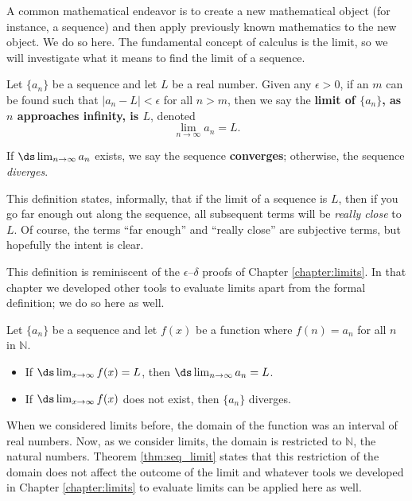 A common mathematical endeavor is to create a new mathematical object (for instance, a sequence) and then apply previously known mathematics to the new object. We do so here. The fundamental concept of calculus is the limit, so we will investigate what it means to find the limit of a sequence.

\setboxwidth{80pt}
{Let $\{a_n\}$ be a sequence and let $L$ be a real number. Given any $\epsilon>0$, if an $m$ can be found such that $|a_n-L|<\epsilon$ for all $n>m$, then we say the \textbf{limit of $\{a_n\}$, as $n$ approaches infinity, is $L$}, denoted $$\lim_{n\to\infty}a_n = L.$$

If $\ds\lim_{n\to\infty} a_n$ exists, we say the sequence \textbf{converges}; otherwise, the sequence \emph{diverges}.
}
\restoreboxwidth


This definition states, informally, that if the limit of a sequence is $L$, then if you go far enough out along the sequence, all subsequent terms will be \emph{really close} to $L$. Of course, the terms ``far enough'' and ``really close'' are subjective terms, but hopefully the intent is clear.

This definition is reminiscent of the $\epsilon$--$\delta$ proofs of Chapter \ref{chapter:limits}. In that chapter we developed other tools to evaluate limits apart from the formal definition; we do so here as well.
\clearpage

\setboxwidth{30pt}
\noindent\hskip-30pt
\begin{minipage}{\specialboxlength}
{Let $\{a_n\}$ be a sequence and let $f(x)$ be a function where $f(n) = a_n$ for all $n$ in $\mathbb{N}$. 
\begin{itemize}
\item		If $\ds \lim_{x\to\infty} f(x) = L$, then $\ds\lim_{n\to\infty} a_n = L$.
\item		If $\ds \lim_{x\to\infty} f(x)$ does not exist, then $\{a_n\}$ diverges.
\end{itemize}
}
\end{minipage}
\restoreboxwidth

When we considered limits before, the domain of the function was an interval of real numbers. Now, as we consider limits, the domain is restricted to $\mathbb{N}$, the natural numbers. Theorem \ref{thm:seq_limit} states that this restriction of the domain does not affect the outcome of the limit and whatever tools we developed in Chapter \ref{chapter:limits} to evaluate limits can be applied here as well.\\

